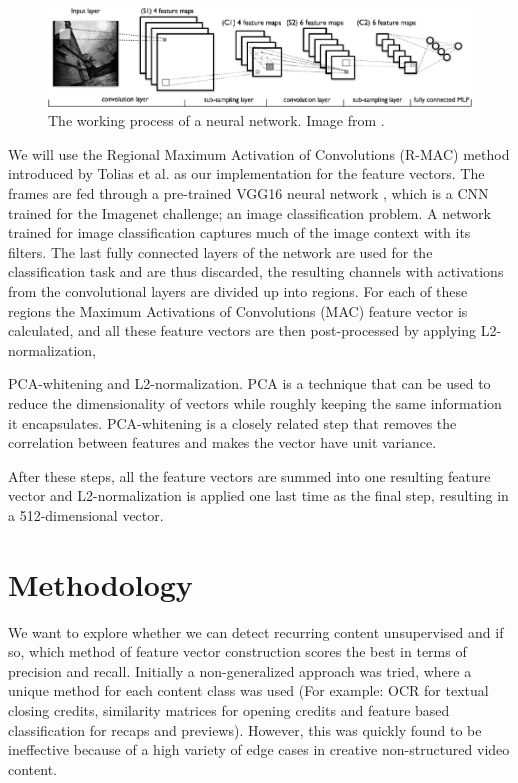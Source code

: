 \documentclass{report}
\begin{document}
\begin{figure}[H]
	\includegraphics[width=\textwidth]{images/convnet.png}
	\centering
	\caption{The working process of a neural network. Image from \cite{convnet-fig}.}
	\label{fig:convnet}
\end{figure}

We will use the Regional Maximum Activation of Convolutions (R-MAC) method introduced by Tolias et al. \cite{tolias2015particular} as our implementation for the feature vectors. The frames are fed through a pre-trained VGG16 neural network \cite{simonyan2014very}, which is a CNN trained for the Imagenet challenge; an image classification problem. A network trained for image classification captures much of the image context with its filters. The last fully connected layers of the network are used for the classification task and are thus discarded, the resulting channels with activations from the convolutional layers are divided up into regions. For each of these regions the Maximum Activations of Convolutions (MAC) feature vector is calculated, and all these feature vectors are then post-processed by applying L2-normalization, 

PCA-whitening and L2-normalization. PCA is a technique that can be used to reduce the dimensionality of vectors while roughly keeping the same information it encapsulates. PCA-whitening is a closely related step that removes the correlation between features and makes the vector have unit variance. 

After these steps, all the feature vectors are summed into one resulting feature vector and L2-normalization is applied one last time as the final step, resulting in a 512-dimensional vector.

\chapter{Methodology} \label{methodology}
We want to explore whether we can detect recurring content unsupervised and if so, which method of feature vector construction scores the best in terms of precision and recall. Initially a non-generalized approach was tried, where a unique method for each content class was used (For example: OCR for textual closing credits, similarity matrices for opening credits and feature based classification for recaps and previews). However, this was quickly found to be ineffective because of a high variety of edge cases in creative non-structured video content. 
\end{document}
